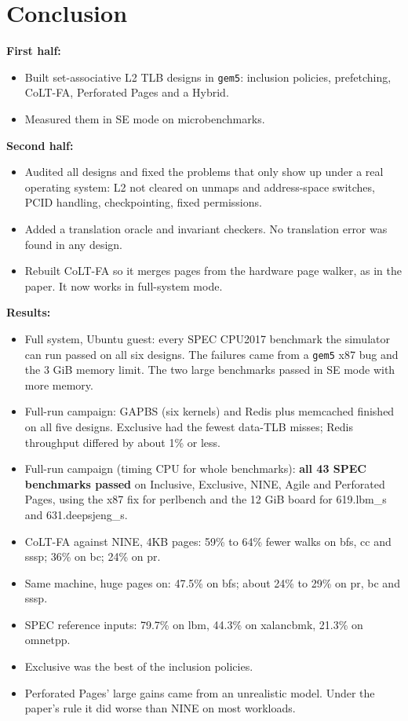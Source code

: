 \section{Conclusion}
\textbf{First half:}
\begin{itemize}
    \item Built set-associative L2 TLB designs in \texttt{gem5}: inclusion policies, prefetching, CoLT-FA, Perforated Pages and a Hybrid.
    \item Measured them in SE mode on microbenchmarks.
\end{itemize}
\textbf{Second half:}
\begin{itemize}
    \item Audited all designs and fixed the problems that only show up under a real operating system: L2 not cleared on unmaps and address-space switches, PCID handling, checkpointing, fixed permissions.
    \item Added a translation oracle and invariant checkers. No translation error was found in any design.
    \item Rebuilt CoLT-FA so it merges pages from the hardware page walker, as in the paper. It now works in full-system mode.
\end{itemize}

\textbf{Results:}
\begin{itemize}
    \item Full system, Ubuntu guest: every SPEC CPU2017 benchmark the simulator can run passed on all six designs. The failures came from a \texttt{gem5} x87 bug and the 3 GiB memory limit. The two large benchmarks passed in SE mode with more memory.
    \item Full-run campaign: GAPBS (six kernels) and Redis plus memcached finished on all five designs. Exclusive had the fewest data-TLB misses; Redis throughput differed by about 1\% or less.
    \item Full-run campaign (timing CPU for whole benchmarks): \textbf{all 43 SPEC benchmarks passed} on Inclusive, Exclusive, NINE, Agile and Perforated Pages, using the x87 fix for perlbench and the 12 GiB board for 619.lbm\_s and 631.deepsjeng\_s.
    \item CoLT-FA against NINE, 4KB pages: 59\% to 64\% fewer walks on bfs, cc and sssp; 36\% on bc; 24\% on pr.
    \item Same machine, huge pages on: 47.5\% on bfs; about 24\% to 29\% on pr, bc and sssp.
    \item SPEC reference inputs: 79.7\% on lbm, 44.3\% on xalancbmk, 21.3\% on omnetpp.
    \item Exclusive was the best of the inclusion policies.
    \item Perforated Pages' large gains came from an unrealistic model. Under the paper's rule it did worse than NINE on most workloads.
\end{itemize}

